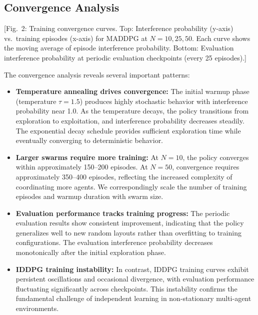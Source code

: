 \documentclass[conference]{IEEEtran}
\begin{document}
\subsection{Convergence Analysis}

[Fig.~2: Training convergence curves. Top: Interference probability (y-axis) vs.\ training episodes (x-axis) for MADDPG at $N=10, 25, 50$. Each curve shows the moving average of episode interference probability. Bottom: Evaluation interference probability at periodic evaluation checkpoints (every 25 episodes).]

The convergence analysis reveals several important patterns:

\begin{itemize}
    \item \textbf{Temperature annealing drives convergence:} The initial warmup phase (temperature $\tau = 1.5$) produces highly stochastic behavior with interference probability near 1.0. As the temperature decays, the policy transitions from exploration to exploitation, and interference probability decreases steadily. The exponential decay schedule provides sufficient exploration time while eventually converging to deterministic behavior.
    
    \item \textbf{Larger swarms require more training:} At $N=10$, the policy converges within approximately 150--200 episodes. At $N=50$, convergence requires approximately 350--400 episodes, reflecting the increased complexity of coordinating more agents. We correspondingly scale the number of training episodes and warmup duration with swarm size.
    
    \item \textbf{Evaluation performance tracks training progress:} The periodic evaluation results show consistent improvement, indicating that the policy generalizes well to new random layouts rather than overfitting to training configurations. The evaluation interference probability decreases monotonically after the initial exploration phase.
    
    \item \textbf{IDDPG training instability:} In contrast, IDDPG training curves exhibit persistent oscillations and occasional divergence, with evaluation performance fluctuating significantly across checkpoints. This instability confirms the fundamental challenge of independent learning in non-stationary multi-agent environments.
\end{itemize}
\end{document}
